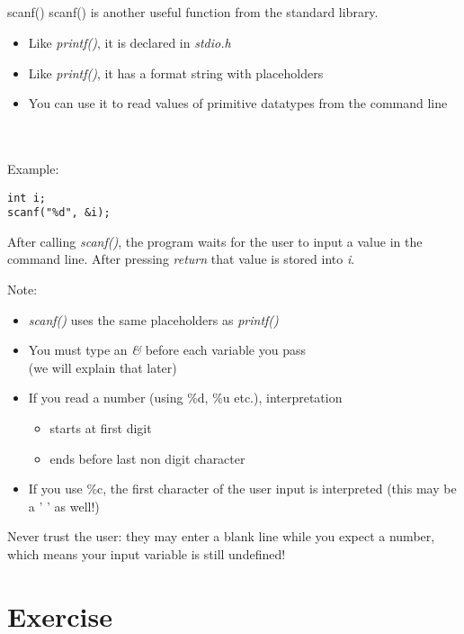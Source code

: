 \subsection{}
\begin{frame}[fragile]{scanf()}
	scanf() is another useful function from the standard library.
	\begin{itemize}
		\item Like \textit{printf()}, it is declared in \textit{stdio.h}
		\item Like \textit{printf()}, it has a format string with placeholders
		\item You can use it to read values of primitive datatypes from the command line
	\end{itemize}
	\ \\ \ \\ Example:
	\begin{lstlisting}[numbers=none]
int i;
scanf("%d", &i);	
\end{lstlisting}
	After calling \textit{scanf()}, the program waits for the user to input a value in the command line.
	After pressing \textit{return} that value is stored into \textit{i}.
\end{frame}
\begin{frame}{Note:}
	\begin{itemize}
		\item \textit{scanf()} uses the same placeholders as \textit{printf()}
		\item You must type an \textit{\&} before each variable you pass \\ (we will explain that later)
		\item If you read a number (using \%d, \%u etc.), interpretation
		\begin{itemize}
			\item starts at first digit
			\item ends before last non digit character
		\end{itemize}
		\item If you use \%c, the first character of the user input is interpreted (this may be a ' ' as well!)
	\end{itemize}
	Never trust the user: they may enter a blank line while you expect a number, which means your input variable is still undefined!
		
\end{frame}
\section{Exercise}
